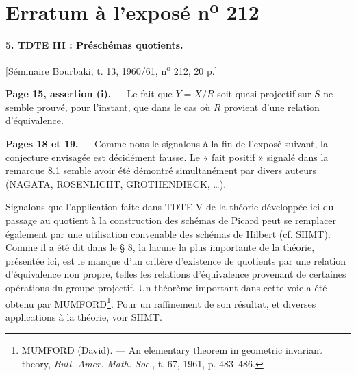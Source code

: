 \clearpage
\chapter*{Erratum à l'exposé n\textsuperscript{o} 212}
\setcounter{footnote}{2}

\noindent\textbf{5. TDTE III : Préschémas quotients.}

\begin{center}
[Séminaire Bourbaki, t. 13, 1960/61, n\textsuperscript{o} 212, 20 p.]
\end{center}

\noindent\textbf{Page 15, assertion (i).} --- Le fait que $Y=X/R$ soit
quasi-projectif sur $S$ ne semble prouvé, pour l'instant, que dans le cas où
$R$ provient d'une relation d'équivalence.

\noindent\textbf{Pages 18 et 19.} --- Comme nous le signalons à la fin de
l'exposé suivant, la conjecture envisagée est décidément fausse. Le « fait
positif » signalé dans la remarque 8.1 semble avoir été démontré simultanément
par divers auteurs (NAGATA, ROSENLICHT, GROTHENDIECK, \ldots).

Signalons que l'application faite dans TDTE V de la théorie développée ici du
passage au quotient à la construction des schémas de Picard peut se remplacer
également par une utilisation convenable des schémas de Hilbert (cf. SHMT).
Comme il a été dit dans le § 8, la lacune la plus importante de la théorie,
présentée
ici, est le manque d'un critère d'existence de quotients par une relation
d'équivalence non propre, telles les relations d'équivalence provenant de
certaines opérations du groupe projectif. Un théorème important dans cette
voie a été obtenu par MUMFORD\footnote{MUMFORD (David). --- An elementary
theorem in geometric invariant theory, \emph{Bull. Amer. Math. Soc.}, t. 67,
1961, p. 483--486.}. Pour un raffinement de son résultat, et diverses
applications à la théorie, voir SHMT.

